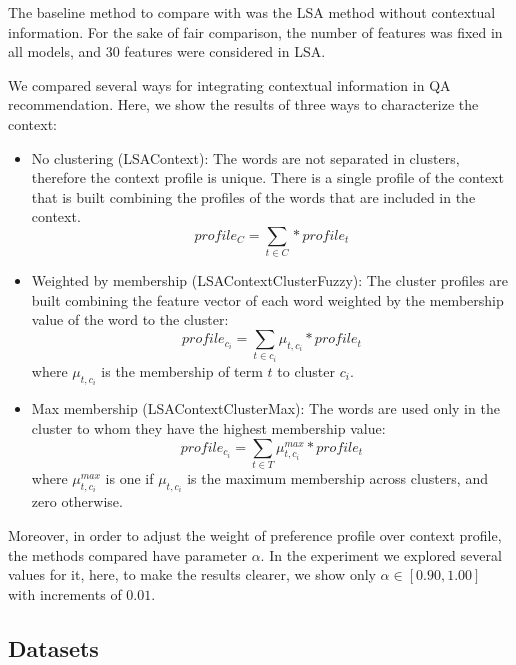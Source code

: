 \documentclass[preprint]{elsarticle}
\begin{document}
\begin{spacing}{1.5}
The baseline method to compare with was the LSA method without contextual information. For the sake of fair comparison, the number of features was fixed in all models, and 30 features were considered in LSA.

We compared several ways for integrating contextual information in QA recommendation. Here, we show the results of three ways to characterize the context:

\begin{itemize}

	\item No clustering (LSAContext): The words are not separated in clusters, therefore the context profile is unique. There is a single profile of the context that is built combining the profiles of the words that are included in the context.
	\begin{equation}
		profile_{C} = \sum_{t \in C} * profile_t
	\end{equation}

	\item Weighted by membership (LSAContextClusterFuzzy): The cluster profiles are built combining the feature vector of each word weighted by the membership value of the word to the cluster:
	\begin{equation}
		profile_{c_i} = \sum_{t \in c_i} \mu_{t,c_i} * profile_t
	\end{equation}
	\noindent where $\mu_{t,c_i}$ is the membership of term $t$ to cluster $c_i$.

	\item Max membership (LSAContextClusterMax): The words are used only in the cluster to whom they have the highest membership value:
	\begin{equation}
		profile_{c_i} = \sum_{t \in T} \mu^{max}_{t,c_i} * profile_t
	\end{equation}
	\noindent where $\mu^{max}_{t,c_i}$ is one if $\mu_{t,c_i}$ is the maximum membership across clusters, and zero otherwise.

\end{itemize}

Moreover, in order to adjust the weight of preference profile over context profile, the methods compared have parameter $\alpha$. In the experiment we explored several values for it, here, to make the results clearer, we show only $\alpha \in [0.90,1.00]$ with increments of $0.01$.

\subsection{Datasets}
\label{sec:case-study-datasets}


\end{spacing}
\end{document}
